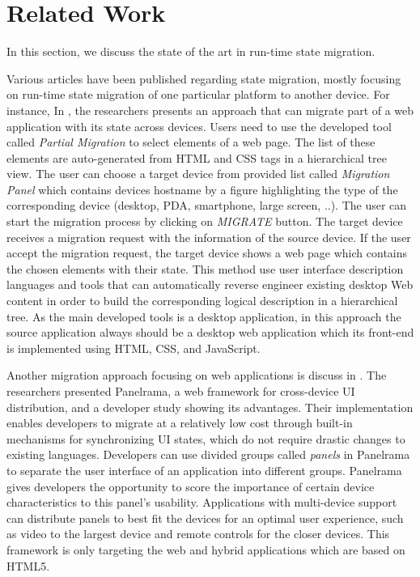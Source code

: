 \chapter{Related Work}
In this section, we discuss the state of the art in run-time state migration.
\label{ch:related}

Various articles have been published regarding state migration, mostly focusing on run-time state migration of one particular platform to another device. For instance, In \cite{r1-10.1145/1851600.1851653}, the researchers presents an approach that can migrate part of a web application with its state across devices. Users need to use the developed tool called \textit{Partial Migration} to select elements of a web page. The list of these elements are auto-generated from HTML and CSS tags in a hierarchical tree view. The user can choose a target device from provided list called \textit{Migration Panel} which contains devices hostname by a figure highlighting the type of the corresponding device (desktop, PDA, smartphone, large screen, ..). The user can start the migration process by clicking on \textit{MIGRATE} button. The target device receives a migration request with the information of the source device. If the user accept the migration request, the target device shows a web page which contains the chosen elements with their state. This method use user interface description languages \cite{r5-maria-10.1145/1614390.1614394} and tools that can automatically reverse engineer existing desktop Web content in order to build the corresponding logical description in a hierarchical tree. As the main developed tools is a desktop application, in this approach the source application always should be a desktop web application which its front-end is implemented using HTML, CSS, and JavaScript.

Another migration approach focusing on web applications is discuss in \cite{r2-zaplata}. The researchers presented Panelrama, a web framework for cross-device UI distribution, and a developer study showing its advantages. Their implementation enables developers to migrate at a relatively low cost through built-in mechanisms for synchronizing UI states, which do not require drastic changes to existing languages. Developers can use divided groups called \textit{panels} in Panelrama to separate the user interface of an application into different groups. Panelrama gives developers the opportunity to score the importance of certain device characteristics to this panel's usability. Applications with multi-device support can distribute panels to best fit the devices for an optimal user experience, such as video to the largest device and remote controls for the closer devices. This framework is only targeting the web and hybrid applications which are based on HTML5.

